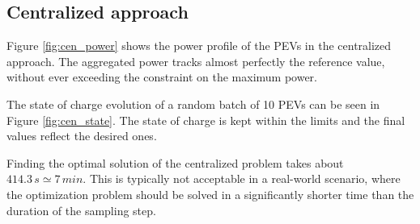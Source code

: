 \subsection{Centralized approach}
Figure \ref{fig:cen_power} shows the power profile of the PEVs in the centralized approach. The aggregated power tracks almost perfectly the reference value, without ever exceeding the constraint on the maximum power.

The state of charge evolution of a random batch of 10 PEVs can be seen in Figure \ref{fig:cen_state}. The state of charge is kept within the limits and the final values reflect the desired ones.

Finding the optimal solution of the centralized problem takes about $414.3\,s \simeq 7\,min $. This is typically not acceptable in a real-world scenario, where the optimization problem should be solved in a significantly shorter time than the duration of the sampling step.